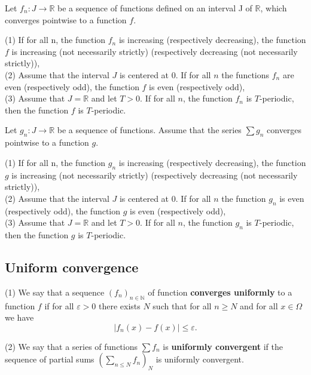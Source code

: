 \documentclass{article}
\newcounter{counter}[subsection] %
\newcommand{\counterbox}{\thesubsection.\arabic{counter}}
\newcommand{\definition}[2]{ %
    \stepcounter{counter}
    \begin{tcolorbox}[
        colback=green!10!white, %
        colframe=green!70!blue!30!white, %
        coltitle=black, %
        fonttitle=\bfseries, %
        title={{Definition \counterbox: #1}}, %
        enhanced, %
        boxed title style={
            colback=cyan!60!black, %
            outer arc=0pt, %
            arc=0pt, %
        },
        before upper={\noindent}, %
    ]
    #2 %
    \end{tcolorbox}
}
\newcommand{\proposition}[2]{ %
    \stepcounter{counter}
    \begin{tcolorbox}[
        colback=cyan!10!white, %
        colframe=cyan!20, %
        coltitle=black, %
        fonttitle=\bfseries, %
        title={
        \if\relax\detokenize{#1}\relax
            {Proposition \counterbox}
        \else
            {Proposition \counterbox: #1}
        \fi 
        },%
        enhanced, %
        boxed title style={
            colback=cyan!60!black, %
            outer arc=0pt, %
            arc=0pt, %
        },
        before upper={\noindent}, %
    ]
    #2 %
    \end{tcolorbox}
}
\begin{document}
\proposition{}{Let $f_n:J\rightarrow\mathbb{R}$ be a sequence of functions defined on an interval J of $\mathbb{R}$, which converges pointwise to a function $f$.

(1) If for all n, the function $f_n$ is increasing (respectively decreasing), the function $f$ is increasing (not necessarily strictly) (respectively decreasing (not necessarily strictly)), \\

(2) Assume that the interval $J$ is centered at 0. If for all $n$ the functions $f_n$ are even (respectively odd), the function $f$ is even (respectively odd), \\

(3) Assume that $J=\mathbb{R}$ and let $T>0$. If for all $n$, the function $f_n$ is $T$-periodic, then the function $f$ is $T$-periodic.
}

\proposition{}{Let $g_n:J\rightarrow\mathbb{R}$ be a sequence of functions. Assume that the series $\sum g_n$ converges pointwise to a function $g$.

(1) If for all n, the function $g_n$ is increasing (respectively decreasing), the function $g$ is increasing (not necessarily strictly) (respectively decreasing (not necessarily strictly)), \\

(2) Assume that the interval $J$ is centered at 0. If for all $n$ the function $g_n$ is even (respectively odd), the function $g$ is even (respectively odd), \\

(3) Assume that $J=\mathbb{R}$ and let $T>0$. If for all $n$, the function $g_n$ is $T$-periodic, then the function $g$ is $T$-periodic.}

\subsection{Uniform convergence}

\definition{Uniform convergence}{
(1) We say that a sequence $(f_n)_{n\in\mathbb{N}}$ of function \textbf{converges uniformly} to a function $f$ if for all $\varepsilon > 0$ there exists $N$ such that for all $n\geq N$ and for all $x\in\Omega$ we have $$|f_n(x)-f(x)| \leq \varepsilon.$$

(2) We say that a series of functions $\sum f_n$ is \textbf{uniformly convergent} if the sequence of partial sums $\displaystyle (\sum_{n\leq N} f_n)_N$ is uniformly convergent.
}

\vspace{-10pt}
\end{document}
